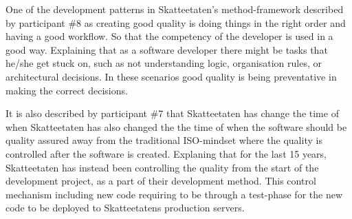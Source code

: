 One of the development patterns in Skatteetaten's method-framework described by participant \#8 as creating good quality is doing things in the right order and having a good workflow. So that the competency of the developer is used in a good way. Explaining that as a software developer there might be tasks that he/she get stuck on, such as not understanding logic, organisation rules, or architectural decisions. In these scenarios good quality is being preventative in making the correct decisions.


It is also described by participant \#7 that Skatteetaten has change the time of when Skatteetaten has also changed the the time of when the software should be quality assured away from the traditional ISO-mindset where the quality is controlled after the software is created. Explaning that for the last 15 years, Skatteetaten has instead been controlling the quality from the start of the development project, as a part of their development method. This control mechanism including new code requiring to be through a test-phase for the new code to be deployed to Skatteetatens production servers.




